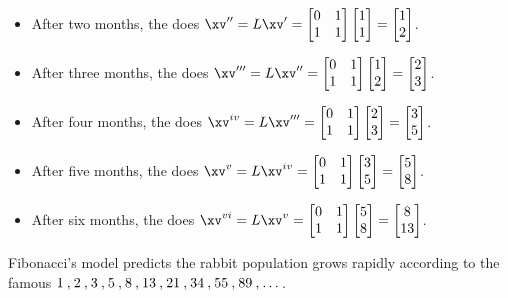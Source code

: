 \begin{example}
\begin{itemize}
\item After two months, the does \(\xv''=L\xv'=\begin{bmatrix} 0&1\\1&1 \end{bmatrix}\begin{bmatrix} 1\\1 \end{bmatrix}=\begin{bmatrix} 1\\2 \end{bmatrix}\).
\item After three months, the does \(\xv'''=L\xv''=\begin{bmatrix} 0&1\\1&1 \end{bmatrix}\begin{bmatrix} 1\\2 \end{bmatrix}=\begin{bmatrix} 2\\3 \end{bmatrix}\).
\item After four months, the does \(\xv^{iv}=L\xv'''=\begin{bmatrix} 0&1\\1&1 \end{bmatrix}\begin{bmatrix} 2\\3 \end{bmatrix}=\begin{bmatrix} 3\\5 \end{bmatrix}\).
\item After five months, the does \(\xv^{v}=L\xv^{iv}=\begin{bmatrix} 0&1\\1&1 \end{bmatrix}\begin{bmatrix} 3\\5 \end{bmatrix}=\begin{bmatrix} 5\\8 \end{bmatrix}\).
\item After six months, the does \(\xv^{vi}=L\xv^{v}=\begin{bmatrix} 0&1\\1&1 \end{bmatrix}\begin{bmatrix} 5\\8 \end{bmatrix}=\begin{bmatrix} 8\\13 \end{bmatrix}\).
\end{itemize}
Fibonacci's model predicts the rabbit population grows rapidly according to the famous  \(\mathcode`\,="213B 1,2,3,5,8,13,21,34,55,89,\ldots\)\,.
\end{example}



